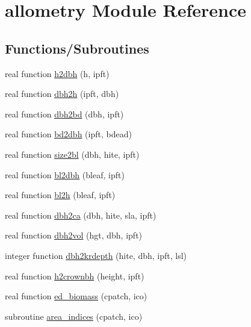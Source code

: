 \hypertarget{namespaceallometry}{}\section{allometry Module Reference}
\label{namespaceallometry}
\subsection*{Functions/\+Subroutines}
\begin{DoxyCompactItemize}
\item 
real function \hyperlink{namespaceallometry_a31aa8db06e86ec74efb5e692417399df}{h2dbh} (h, ipft)
\item 
real function \hyperlink{namespaceallometry_a56f11dc07da4d5e7114dc37d6cc5f2cc}{dbh2h} (ipft, dbh)
\item 
real function \hyperlink{namespaceallometry_a76db2bc4aaa47db1e2656117ec476dba}{dbh2bd} (dbh, ipft)
\item 
real function \hyperlink{namespaceallometry_a50fedbee3a14eb5569a62abb4a36198f}{bd2dbh} (ipft, bdead)
\item 
real function \hyperlink{namespaceallometry_a45ced9bf9ccd03debe8def35b579f4bd}{size2bl} (dbh, hite, ipft)
\item 
real function \hyperlink{namespaceallometry_a3236375dc165a26aeea2d97c7e2c2685}{bl2dbh} (bleaf, ipft)
\item 
real function \hyperlink{namespaceallometry_a59a1fc10140498dee62fce8a641da254}{bl2h} (bleaf, ipft)
\item 
real function \hyperlink{namespaceallometry_abacdf8e8e585ce8d788a1fc2be133243}{dbh2ca} (dbh, hite, sla, ipft)
\item 
real function \hyperlink{namespaceallometry_aab2b2cee61cac31529246b043121c7de}{dbh2vol} (hgt, dbh, ipft)
\item 
integer function \hyperlink{namespaceallometry_ac1523ea0e0ef8d2dd6a429f61a013c1c}{dbh2krdepth} (hite, dbh, ipft, lsl)
\item 
real function \hyperlink{namespaceallometry_a88949ed487fccc2f1dfd065399043b0d}{h2crownbh} (height, ipft)
\item 
real function \hyperlink{namespaceallometry_ab6a3d3302db0096b21354babe768677b}{ed\+\_\+biomass} (cpatch, ico)
\item 
subroutine \hyperlink{namespaceallometry_ac715c0d308392f2b0eee93ab9ae210b1}{area\+\_\+indices} (cpatch, ico)
\end{DoxyCompactItemize}


